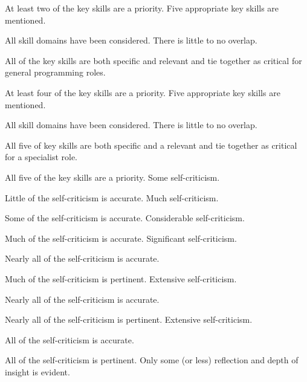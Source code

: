 \documentclass{../../fal_assignment}
\begin{document}
\begin{markingrubric}
        \par 		At least two of the key skills are a priority.
        \grade 		Five appropriate key skills are mentioned.
        \par 		All skill domains have been considered. There is little to no overlap.
        \par 		All of the key skills are both specific and relevant and tie together as critical for general programming roles.
        \par 		At least four of the key skills are a priority.
        \grade 		Five appropriate key skills are mentioned.
        \par 		All skill domains have been considered. There is little to no overlap.
        \par 		All five of key skills are both specific and a relevant and tie together as critical for a specialist role.
        \par 		All five of the key skills are a priority.
%
        \grade \fail		Some self-criticism.
           \par 		Little of the self-criticism is accurate.
        \grade 		Much self-criticism.
         \par 		Some of the self-criticism is accurate.
        \grade 		Considerable self-criticism.
         \par 		Much of the self-criticism is accurate.
        \grade 		Significant self-criticism.
         \par 		Nearly all of the self-criticism is accurate.
            \par 		Much of the self-criticism is pertinent.
        \grade 		Extensive self-criticism.
         \par 		Nearly all of the self-criticism is accurate.
            \par 		Nearly all of the self-criticism is pertinent.
        \grade 		Extensive self-criticism.
         \par 		All of the self-criticism is accurate.
            \par 		All of the self-criticism is pertinent.
%
        \grade \fail 	Only some (or less) reflection and depth of insight is evident.

\end{markingrubric}
\end{document}
